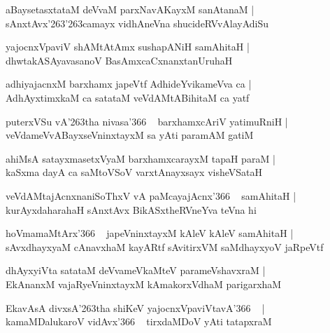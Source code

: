 \documentclass[twoside,12pt,openright]{book}
\def\S{\char'263}
\newcounter{shloka}[chapter]
\begin{document}
\begin{shloka}
aBaysetasxtataM deVvaM parxNavAKayxM sanAtanaM |\\
sAnxtAvx\S\S camayx vidhAneVna shucideRVvAlayAdiSu 
\end{shloka}

\begin{shloka}
yajocnxVpaviV shAMtAtAmx sushapANiH samAhitaH |\\
dhwtakASAyavasanoV BasAmxcaCxnanxtanUruhaH 
\end{shloka}

\begin{shloka}
adhiyajacnxM barxhamx japeVtf AdhideYvikameVva ca |\\
AdhAyxtimxkaM ca satataM veVdAMtABihitaM ca yatf 
\end{shloka}

\begin{shloka}
puterxVSu vA\S tha nivasa\char'366 ~ barxhamxcAriV yatimuRniH |\\
veVdameVvABayxseVninxtayxM sa yAti paramAM gatiM  
\end{shloka}

\begin{shloka}
ahiMsA satayxmasetxVyaM barxhamxcarayxM tapaH paraM |\\
kaSxma dayA ca saMtoVSoV varxtAnayxsayx visheVSataH 
\end{shloka}

\begin{shloka}
veVdAMtajAcnxnaniSoThxV vA paMcayajAcnx\char'366 ~ samAhitaH |\\
kurAyxdaharahaH sAnxtAvx BikASxtheRVneYva teVna hi 
\end{shloka}

\begin{shloka}
hoVmamaMtArx\char'366 ~ japeVninxtayxM kAleV kAleV samAhitaH |\\
sAvxdhayxyaM cAnavxhaM kayARtf sAvitirxVM saMdhayxyoV jaRpeVtf 
\end{shloka}

\begin{shloka}
dhAyxyiVta satataM deVvameVkaMteV parameVshavxraM |\\
EkAnanxM vajaRyeVninxtayxM kAmakorxVdhaM parigarxhaM 
\end{shloka}

\begin{shloka}
EkavAsA divxsA\S tha shiKeV yajocnxVpaviVtavA\char'366 ~ |\\
kamaMDalukaroV vidAvx\char'366 ~ tirxdaMDoV yAti tatapxraM 
\end{shloka}
\end{document}
